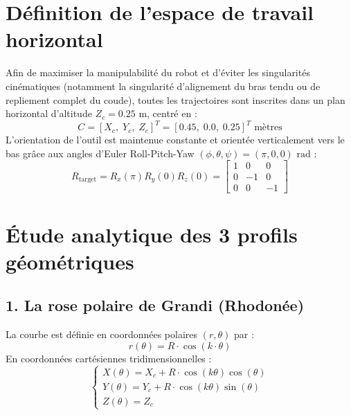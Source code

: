 \documentclass[11pt,a4paper]{report}
\begin{document}
\section{Définition de l'espace de travail horizontal}
Afin de maximiser la manipulabilité du robot et d'éviter les singularités cinématiques (notamment la singularité d'alignement du bras tendu ou de repliement complet du coude), toutes les trajectoires sont inscrites dans un plan horizontal d'altitude $Z_c = 0.25\text{ m}$, centré en :
\begin{equation}
    C = [X_c, \; Y_c, \; Z_c]^T = [0.45, \; 0.0, \; 0.25]^T \text{ mètres}
\end{equation}
L'orientation de l'outil est maintenue constante et orientée verticalement vers le bas grâce aux angles d'Euler Roll-Pitch-Yaw $(\phi, \theta, \psi) = (\pi, 0, 0)\text{ rad}$ :
\begin{equation}
    R_{\text{target}} = R_x(\pi) R_y(0) R_z(0) = 
    \begin{bmatrix}
        1 & 0 & 0 \\
        0 & -1 & 0 \\
        0 & 0 & -1
    \end{bmatrix}
\end{equation}

\section{Étude analytique des 3 profils géométriques}

\subsection{1. La rose polaire de Grandi (Rhodonée)}
La courbe est définie en coordonnées polaires $(r, \theta)$ par :
\begin{equation}
    r(\theta) = R \cdot \cos(k \cdot \theta)
\end{equation}
En coordonnées cartésiennes tridimensionnelles :
\begin{equation}
    \begin{cases}
        X(\theta) = X_c + R \cdot \cos(k\theta) \cos(\theta) \\
        Y(\theta) = Y_c + R \cdot \cos(k\theta) \sin(\theta) \\
        Z(\theta) = Z_c
    \end{cases}
\end{equation}
\end{document}
